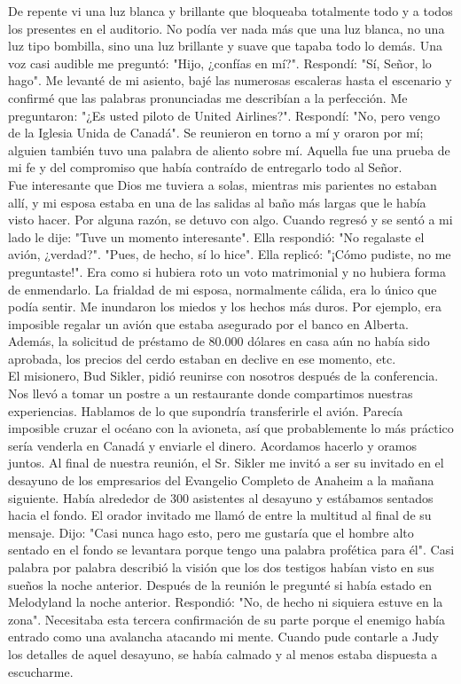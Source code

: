 \documentclass[twoside, 12pt]{book}
\begin{document}
De repente vi una luz blanca y brillante que bloqueaba totalmente todo y a todos los presentes en el auditorio. No podía ver nada más que una luz blanca, no una luz tipo bombilla, sino una luz brillante y suave que tapaba todo lo demás. Una voz casi audible me preguntó: "Hijo, ¿confías en mí?". Respondí: "Sí, Señor, lo hago". Me levanté de mi asiento, bajé las numerosas escaleras hasta el escenario y confirmé que las palabras pronunciadas me describían a la perfección. Me preguntaron: "¿Es usted piloto de United Airlines?". Respondí: "No, pero vengo de la Iglesia Unida de Canadá". Se reunieron en torno a mí y oraron por mí; alguien también tuvo una palabra de aliento sobre mí. Aquella fue una prueba de mi fe y del compromiso que había contraído de entregarlo todo al Señor.\\

Fue interesante que Dios me tuviera a solas, mientras mis parientes no estaban allí, y mi esposa estaba en una de las salidas al baño más largas que le había visto hacer. Por alguna razón, se detuvo con algo. Cuando regresó y se sentó a mi lado le dije: "Tuve un momento interesante". Ella respondió: "No regalaste el avión, ¿verdad?". "Pues, de hecho, sí lo hice". Ella replicó: "¡Cómo pudiste, no me preguntaste!". Era como si hubiera roto un voto matrimonial y no hubiera forma de enmendarlo. La frialdad de mi esposa, normalmente cálida, era lo único que podía sentir. Me inundaron los miedos y los hechos más duros. Por ejemplo, era imposible regalar un avión que estaba asegurado por el banco en Alberta. Además, la solicitud de préstamo de 80.000 dólares en casa aún no había sido aprobada, los precios del cerdo estaban en declive en ese momento, etc.\\

El misionero, Bud Sikler, pidió reunirse con nosotros después de la conferencia. Nos llevó a tomar un postre a un restaurante donde compartimos nuestras experiencias. Hablamos de lo que supondría transferirle el avión. Parecía imposible cruzar el océano con la avioneta, así que probablemente lo más práctico sería venderla en Canadá y enviarle el dinero. Acordamos hacerlo y oramos juntos. Al final de nuestra reunión, el Sr. Sikler me invitó a ser su invitado en el desayuno de los empresarios del Evangelio Completo de Anaheim a la mañana siguiente. Había alrededor de 300 asistentes al desayuno y estábamos sentados hacia el fondo. El orador invitado me llamó de entre la multitud al final de su mensaje. Dijo: "Casi nunca hago esto, pero me gustaría que el hombre alto sentado en el fondo se levantara porque tengo una palabra profética para él". Casi palabra por palabra describió la visión que los dos testigos habían visto en sus sueños la noche anterior. Después de la reunión le pregunté si había estado en Melodyland la noche anterior. Respondió: "No, de hecho ni siquiera estuve en la zona". Necesitaba esta tercera confirmación de su parte porque el enemigo había entrado como una avalancha atacando mi mente. Cuando pude contarle a Judy los detalles de aquel desayuno, se había calmado y al menos estaba dispuesta a escucharme.\\
\end{document}
